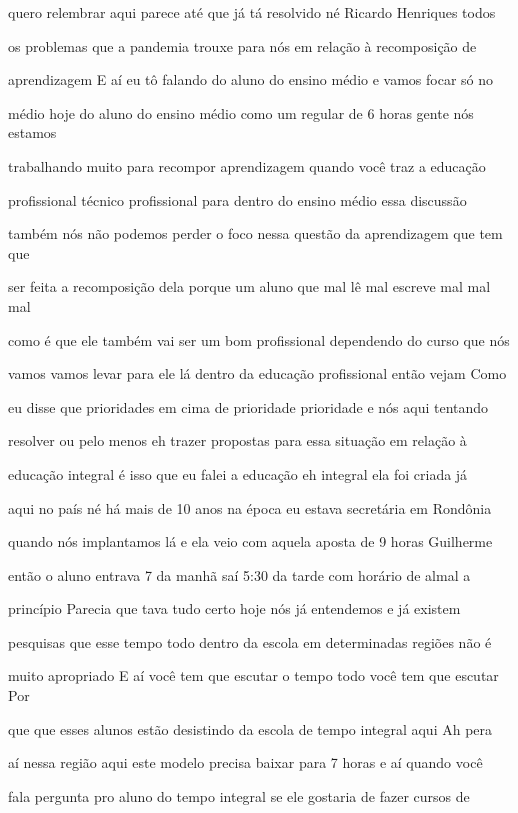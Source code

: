 \documentclass[a4paper,12pt]{article}
\begin{document}
quero relembrar aqui parece até que já tá resolvido né Ricardo Henriques todos

os problemas que a pandemia trouxe para nós em relação à recomposição de

aprendizagem E aí eu tô falando do aluno do ensino médio e vamos focar só no

médio hoje do aluno do ensino médio como um regular de 6 horas gente nós estamos

trabalhando muito para recompor aprendizagem quando você traz a educação

profissional técnico profissional para dentro do ensino médio essa discussão

também nós não podemos perder o foco nessa questão da aprendizagem que tem que

ser feita a recomposição dela porque um aluno que mal lê mal escreve mal mal mal

como é que ele também vai ser um bom profissional dependendo do curso que nós

vamos vamos levar para ele lá dentro da educação profissional então vejam Como

eu disse que prioridades em cima de prioridade prioridade e nós aqui tentando

resolver ou pelo menos eh trazer propostas para essa situação em relação à

educação integral é isso que eu falei a educação eh integral ela foi criada já

aqui no país né há mais de 10 anos na época eu estava secretária em Rondônia

quando nós implantamos lá e ela veio com aquela aposta de 9 horas Guilherme

então o aluno entrava 7 da manhã saí 5:30 da tarde com horário de almal a

princípio Parecia que tava tudo certo hoje nós já entendemos e já existem

pesquisas que esse tempo todo dentro da escola em determinadas regiões não é

muito apropriado E aí você tem que escutar o tempo todo você tem que escutar Por

que que esses alunos estão desistindo da escola de tempo integral aqui Ah pera

aí nessa região aqui este modelo precisa baixar para 7 horas e aí quando você

fala pergunta pro aluno do tempo integral se ele gostaria de fazer cursos de
\end{document}
